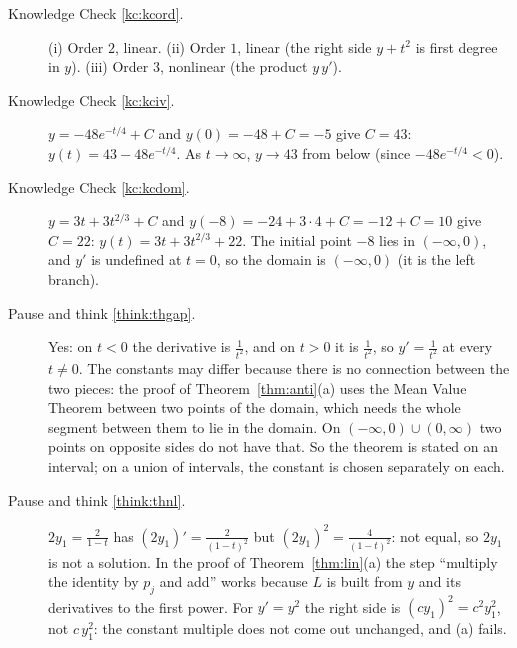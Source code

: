 \documentclass[11pt]{article}
\begin{document}
\begin{description}

  \item[Knowledge Check \ref{kc:kcord}.] (i) Order $2$, linear. (ii) Order $1$, linear (the right side $y+t^2$ is first degree in $y$). (iii) Order $3$, nonlinear (the product $y\,y'$).

  \item[Knowledge Check \ref{kc:kciv}.] $y=-48e^{-t/4}+C$ and $y(0)=-48+C=-5$ give $C=43$: $y(t)=43-48e^{-t/4}$. As $t\to\infty$, $y\to43$ from below (since $-48e^{-t/4}<0$).

  \item[Knowledge Check \ref{kc:kcdom}.] $y=3t+3t^{2/3}+C$ and $y(-8)=-24+3\cdot4+C=-12+C=10$ give $C=22$: $y(t)=3t+3t^{2/3}+22$. The initial point $-8$ lies in $(-\infty,0)$, and $y'$ is undefined at $t=0$, so the domain is $(-\infty,0)$ (it is the left branch).

  \item[Pause and think \ref{think:thgap}.] Yes: on $t<0$ the derivative is $\frac1{t^2}$, and on $t>0$ it is $\frac1{t^2}$, so $y'=\frac1{t^2}$ at every $t\ne0$. The constants may differ because there is no connection between the two pieces: the proof of Theorem~\ref{thm:anti}(a) uses the Mean Value Theorem between two points of the domain, which needs the whole segment between them to lie in the domain. On $(-\infty,0)\cup(0,\infty)$ two points on opposite sides do not have that. So the theorem is stated on an interval; on a union of intervals, the constant is chosen separately on each.

  \item[Pause and think \ref{think:thnl}.] $2y_1=\frac2{1-t}$ has $(2y_1)'=\frac2{(1-t)^2}$ but $(2y_1)^2=\frac4{(1-t)^2}$: not equal, so $2y_1$ is not a solution. In the proof of Theorem~\ref{thm:lin}(a) the step ``multiply the identity by $p_j$ and add'' works because $L$ is built from $y$ and its derivatives to the first power. For $y'=y^2$ the right side is $(cy_1)^2=c^2y_1^2$, not $c\,y_1^2$: the constant multiple does not come out unchanged, and (a) fails.


\end{description}
\end{document}
